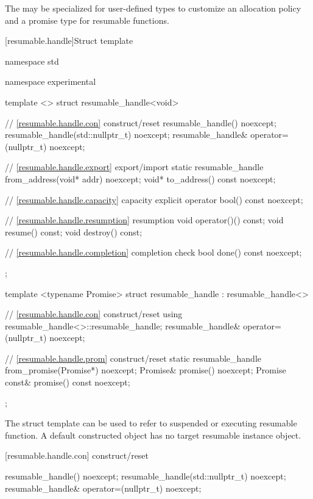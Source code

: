 \pnum
The  may be specialized for user-defined types 
to customize an allocation policy and a promise type for resumable functions.


[resumable.handle]{Struct template }

%
\begin{codeblock}
namespace std {
  namespace experimental {
    template <>
    struct resumable_handle<void>
    {
      // \ref{resumable.handle.con} construct/reset
      resumable_handle() noexcept;		
      resumable_handle(std::nullptr_t) noexcept;
      resumable_handle& operator=(nullptr_t) noexcept;
      
      // \ref{resumable.handle.export} export/import
      static resumable_handle from_address(void* addr) noexcept;		
      void* to_address() const noexcept;
      
      // \ref{resumable.handle.capacity} capacity
      explicit operator bool() const noexcept;
      
      // \ref{resumable.handle.resumption} resumption
      void operator()() const;
      void resume() const;	
      void destroy() const;
      
      // \ref{resumable.handle.completion} completion check
      bool done() const noexcept; 
    };
    
    template <typename Promise>
    struct resumable_handle : resumable_handle<>
    {
      // \ref{resumable.handle.con} construct/reset
      using resumable_handle<>::resumable_handle;
      resumable_handle& operator=(nullptr_t) noexcept;
      
      // \ref{resumable.handle.prom} construct/reset
      static resumable_handle from_promise(Promise*) noexcept;		
      Promise& promise() noexcept;		
      Promise const& promise() const noexcept;
    };
  }
}
\end{codeblock}

\pnum
The struct template 
can be used to refer to suspended or executing resumable function.
A default constructed  object has no target 
resumable instance object.


[resumable.handle.con]{ construct/reset}
\begin{itemdecl}
      resumable_handle() noexcept;		
      resumable_handle(std::nullptr_t) noexcept;
      resumable_handle& operator=(nullptr_t) noexcept;
\end{itemdecl}

